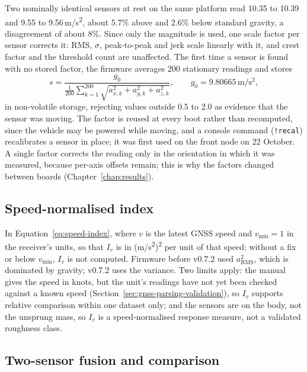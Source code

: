 Two nominally identical sensors at rest on the same platform read 10.35 to 10.39 and 9.55 to 9.56\,m/s\textsuperscript{2}, about 5.7\% above and 2.6\% below standard gravity, a disagreement of about 8\%. Since only the magnitude is used, one scale factor per sensor corrects it: RMS, $\sigma$, peak-to-peak and jerk scale linearly with it, and crest factor and the threshold count are unaffected. The first time a sensor is found with no stored factor, the firmware averages 200 stationary readings and stores
\begin{equation}
s = \frac{g_0}{\frac{1}{200}\sum_{k=1}^{200} \sqrt{a_{x,k}^2 + a_{y,k}^2 + a_{z,k}^2}}, \qquad g_0 = 9.80665\,\mathrm{m/s^2},
\label{eq:calibration}
\end{equation}
in non-volatile storage, rejecting values outside 0.5 to 2.0 as evidence that the sensor was moving. The factor is reused at every boot rather than recomputed, since the vehicle may be powered while moving, and a console command (\texttt{!recal}) recalibrates a sensor in place; it was first used on the front node on 22 October. A single factor corrects the reading only in the orientation in which it was measured, because per-axis offsets remain; this is why the factors changed between boards (Chapter~\ref{chap:results}).

\subsection{Speed-normalised index}
\label{sec:impl-speed}

In Equation~\ref{eq:speed-index}, where $v$ is the latest GNSS speed and $v_{\min} = 1$ in the receiver's units, so that $I_v$ is in (m/s\textsuperscript{2})\textsuperscript{2} per unit of that speed; without a fix or below $v_{\min}$, $I_v$ is not computed. Firmware before v0.7.2 used $a_{\mathrm{RMS}}^2$, which is dominated by gravity; v0.7.2 uses the variance. Two limits apply: the manual gives the speed in knots, but the unit's readings have not yet been checked against a known speed (Section~\ref{sec:gnss-parsing-validation}), so $I_v$ supports relative comparison within one dataset only; and the sensors are on the body, not the unsprung mass, so $I_v$ is a speed-normalised response measure, not a validated roughness class.

\subsection{Two-sensor fusion and comparison}
\label{sec:impl-fusion}

